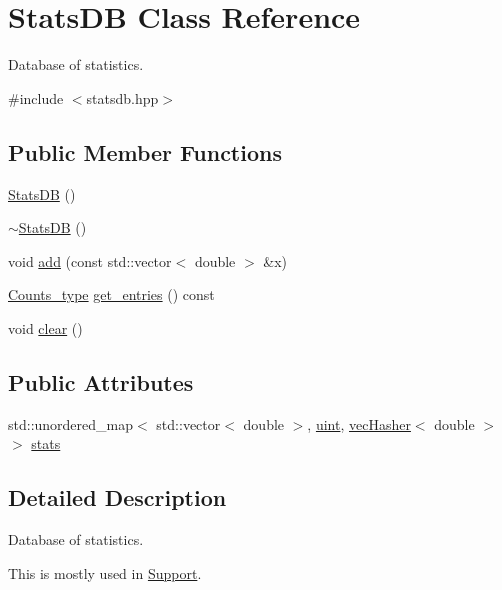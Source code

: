 \hypertarget{class_stats_d_b}{}\section{Stats\+DB Class Reference}
\label{class_stats_d_b}


Database of statistics.  




{\ttfamily \#include $<$statsdb.\+hpp$>$}

\subsection*{Public Member Functions}
\begin{DoxyCompactItemize}
\item 
\hyperlink{class_stats_d_b_a454159e71dfe6af418dfdd8704c38c8c}{Stats\+DB} ()
\item 
\hyperlink{class_stats_d_b_ab4a9371d706b7418df5cb44e81fb5429}{$\sim$\+Stats\+DB} ()
\item 
void \hyperlink{class_stats_d_b_a5759e17b759fcafeec7601188aaa8266}{add} (const std\+::vector$<$ double $>$ \&x)
\item 
\hyperlink{typedefs_8hpp_aee40fa17c1fddb63dd1f2b1470ade95b}{Counts\+\_\+type} \hyperlink{class_stats_d_b_a8ed62f6a3939b90b3493de944c9b67fc}{get\+\_\+entries} () const
\item 
void \hyperlink{class_stats_d_b_a5de68def55b0a3b99a8f609815624a00}{clear} ()
\end{DoxyCompactItemize}
\subsection*{Public Attributes}
\begin{DoxyCompactItemize}
\item 
std\+::unordered\+\_\+map$<$ std\+::vector$<$ double $>$, \hyperlink{typedefs_8hpp_a91ad9478d81a7aaf2593e8d9c3d06a14}{uint}, \hyperlink{structvec_hasher}{vec\+Hasher}$<$ double $>$ $>$ \hyperlink{class_stats_d_b_a675ecc967115b14bf8693858920a4a6c}{stats}
\end{DoxyCompactItemize}


\subsection{Detailed Description}
Database of statistics. 

This is mostly used in {\ttfamily \hyperlink{class_support}{Support}}. 

